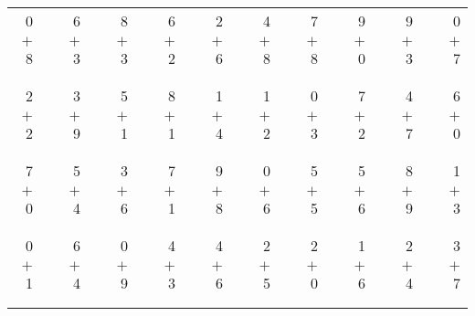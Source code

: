 \documentclass[12pt, letterpaper]{article}
\begin{document}
\begin{tabular}{rrrrrrrrrrrrrrrrrrr}
0 & & 6 & & 8 & & 6 & & 2 & & 4 & & 7 & & 9 & & 9 & & 0\\
$+$ 8 & & $+$ 3 & & $+$ 3 & & $+$ 2 & & $+$ 6 & & $+$ 8 & & $+$ 8 & & $+$ 0 & & $+$ 3 & & $+$ 7\\
\cline{1-1} \cline{3-3} \cline{5-5} \cline{7-7} \cline{9-9} \cline{11-11} \cline{13-13} \cline{15-15} \cline{17-17} \cline{19-19} \\ \\
2 & & 3 & & 5 & & 8 & & 1 & & 1 & & 0 & & 7 & & 4 & & 6\\
$+$ 2 & & $+$ 9 & & $+$ 1 & & $+$ 1 & & $+$ 4 & & $+$ 2 & & $+$ 3 & & $+$ 2 & & $+$ 7 & & $+$ 0\\
\cline{1-1} \cline{3-3} \cline{5-5} \cline{7-7} \cline{9-9} \cline{11-11} \cline{13-13} \cline{15-15} \cline{17-17} \cline{19-19} \\ \\
7 & & 5 & & 3 & & 7 & & 9 & & 0 & & 5 & & 5 & & 8 & & 1\\
$+$ 0 & & $+$ 4 & & $+$ 6 & & $+$ 1 & & $+$ 8 & & $+$ 6 & & $+$ 5 & & $+$ 6 & & $+$ 9 & & $+$ 3\\
\cline{1-1} \cline{3-3} \cline{5-5} \cline{7-7} \cline{9-9} \cline{11-11} \cline{13-13} \cline{15-15} \cline{17-17} \cline{19-19} \\ \\
0 & & 6 & & 0 & & 4 & & 4 & & 2 & & 2 & & 1 & & 2 & & 3\\
$+$ 1 & & $+$ 4 & & $+$ 9 & & $+$ 3 & & $+$ 6 & & $+$ 5 & & $+$ 0 & & $+$ 6 & & $+$ 4 & & $+$ 7\\
\cline{1-1} \cline{3-3} \cline{5-5} \cline{7-7} \cline{9-9} \cline{11-11} \cline{13-13} \cline{15-15} \cline{17-17} \cline{19-19} \\ \\
\end{tabular}
\newpage
\end{document}

